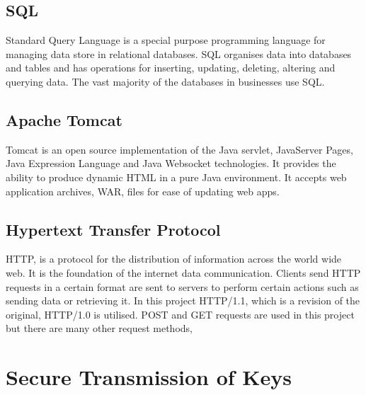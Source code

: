 \subsection{SQL}

Standard Query Language is a special purpose programming language for managing data store in relational databases. SQL organises data into databases and tables and has operations for inserting, updating, deleting, altering and querying data. The vast majority of the databases in businesses use SQL.

\subsection{Apache Tomcat}

Tomcat is an open source implementation of the Java servlet, JavaServer Pages, Java Expression Language and Java Websocket technologies. It provides the ability to produce dynamic HTML in a pure Java environment. It accepts web application archives, WAR, files for ease of updating web apps.


\subsection{Hypertext Transfer Protocol}

HTTP, is a protocol for the distribution of information across the world wide web. It is the foundation of the internet data communication. Clients send HTTP requests in a certain format are sent to servers to perform certain actions such as sending data or retrieving it. In this project HTTP/1.1, which is a revision of the original, HTTP/1.0 is utilised. POST and GET requests are used in this project but there are many other request methods,

\section{Secure Transmission of Keys}

